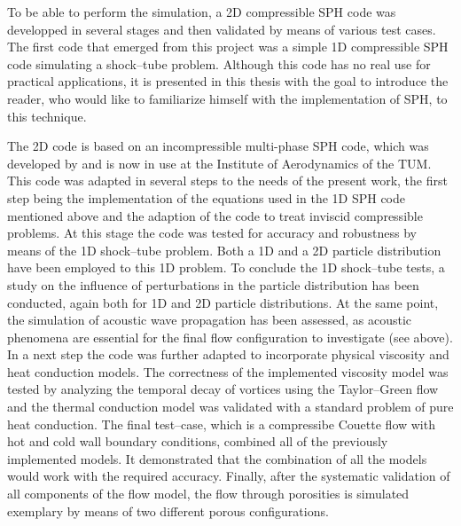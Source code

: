 \documentclass{report}
\begin{document}
To be able to perform the simulation, a 2D compressible SPH code was developped in several stages and then validated by means of various test cases.
The first code that emerged from this project was a simple 1D compressible SPH code simulating a shock--tube problem. Although this code has no real use for practical applications, it is presented in this thesis with the goal to introduce the reader, who would like to familiarize himself with the implementation of SPH, to this technique.

The 2D code is based on an incompressible multi-phase SPH code, which was developed by \cite{Hu2006} and is now in use at the Institute of Aerodynamics of the TUM. This code was adapted in several steps to the needs of the present work, the first step being the implementation of the equations used in the 1D SPH code mentioned above and the adaption of the code to treat inviscid compressible problems. At this stage the code was tested for accuracy and robustness
by means of the 1D shock--tube problem. Both a 1D and a 2D particle distribution have been employed to this 1D problem. To conclude the 1D shock--tube tests, a study on the influence of perturbations in the particle distribution has been conducted, again both for 1D and 2D particle distributions.
At the same point, the simulation of acoustic wave propagation has been assessed, as acoustic phenomena are essential for the final flow configuration to investigate (see above).
In a next step the code was further adapted to incorporate physical viscosity and heat conduction models. The correctness of the implemented viscosity model was tested by analyzing the temporal decay of vortices using the Taylor--Green flow and the thermal conduction model was validated with a standard problem of pure heat conduction.
The final test--case, which is a compressibe Couette flow with hot and cold wall boundary conditions, combined all of the previously implemented models. It demonstrated that the combination of all the models would work with the required accuracy.
Finally, after the systematic validation of all components of the flow model, the flow through porosities is simulated exemplary by means of two different porous configurations. 
\end{document}
